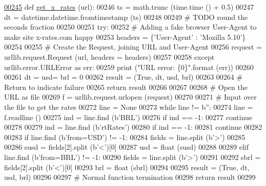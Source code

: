 \begin{DoxyCode}
\hypertarget{namespaceexch2exch.tex_l00245}{}\hyperlink{namespaceexch2exch_a928a1249a810cfd0ec5fca3ec8f764fb}{00245} \textcolor{keyword}{def }\hyperlink{namespaceexch2exch_a928a1249a810cfd0ec5fca3ec8f764fb}{get\_x\_rates} (url):
00246     ts = math.trunc (time.time () + 0.5)
00247     dt = datetime.datetime.fromtimestamp (ts)
00248     
00249     \textcolor{comment}{# TODO round the seconds fraction}
00250     
00251     \textcolor{keywordflow}{try}:
00252         \textcolor{comment}{# Adding a fake browser User-Agent to make site x-rates.com happy}
00253         headers = \{\textcolor{stringliteral}{'User-Agent'} : \textcolor{stringliteral}{'Mozilla 5.10'}\}
00254             
00255         \textcolor{comment}{# Create the Request, joining URL and User-Agent}
00256         request = urllib.request.Request (url, headers = headers)
00257         
00258     \textcolor{keywordflow}{except} urllib.error.URLError \textcolor{keyword}{as} err:
00259         \textcolor{keywordflow}{print} (\textcolor{stringliteral}{"URL error: \{0\}"}.format (err))
00260         
00261         dt = usd= brl = 0
00262         result = (\textcolor{keyword}{True}, dt, usd, brl)
00263         
00264         \textcolor{comment}{# Return to indicate failure}
00265         \textcolor{keywordflow}{return} result
00266 
00267         
00268     \textcolor{comment}{# Open the URL as file}
00269     f = urllib.request.urlopen (request)
00270     
00271     \textcolor{comment}{# Input over the file to get the rates}
00272     line = \textcolor{keywordtype}{None}
00273     \textcolor{keywordflow}{while} line != b\textcolor{stringliteral}{''}:
00274         line = f.readline ()
00275         ind = line.find (b\textcolor{stringliteral}{'BRL'})
00276         \textcolor{keywordflow}{if} ind == -1:
00277             \textcolor{keywordflow}{continue} 
00278         
00279         ind = line.find (b\textcolor{stringliteral}{'rtRates'})
00280         \textcolor{keywordflow}{if} ind == -1:
00281             \textcolor{keywordflow}{continue} 
00282                 
00283         \textcolor{keywordflow}{if} line.find (b\textcolor{stringliteral}{'from=USD'}) != -1:
00284             fields = line.split (b\textcolor{stringliteral}{'>'})
00285             
00286             susd = fields[2].split (b\textcolor{stringliteral}{'<'})[0]
00287             usd = float (susd)
00288         
00289         \textcolor{keywordflow}{elif} line.find (b\textcolor{stringliteral}{'from=BRL'}) != -1:
00290             fields = line.split (b\textcolor{stringliteral}{'>'})
00291             
00292             sbrl = fields[2].split (b\textcolor{stringliteral}{'<'})[0]
00293             brl = float (sbrl)
00294             
00295     result = (\textcolor{keyword}{True}, dt, usd, brl)
00296     
00297     \textcolor{comment}{# Normal function termination}
00298     \textcolor{keywordflow}{return} result
00299     
\end{DoxyCode}
